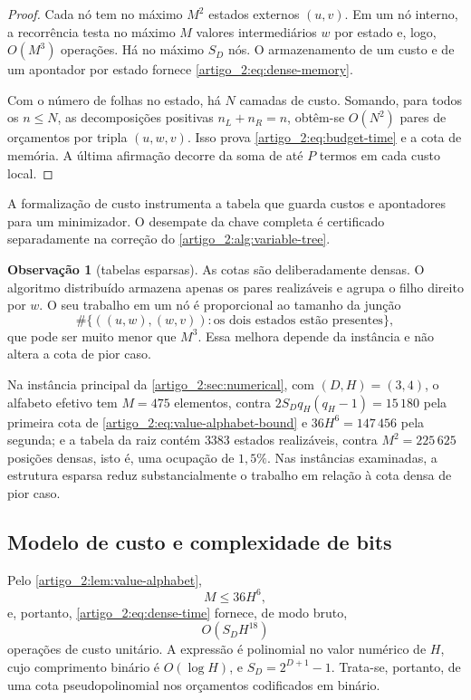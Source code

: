 \documentclass[12pt,a4paper]{article}
\theoremstyle{preciso}
\theoremstyle{definition}
\theoremstyle{preciso}
\theoremstyle{preciso}
\theoremstyle{preciso}
\theoremstyle{preciso}
\theoremstyle{definition}
\theoremstyle{preciso}
\theoremstyle{definition}
\newtheorem{remark}[teorema]{Observação}
\theoremstyle{preciso}
\theoremstyle{preciso}
\theoremstyle{definition}
\begin{document}
\begin{proof}
Cada nó tem no máximo $M^2$ estados externos $(u,v)$. Em um nó interno, a
recorrência testa no máximo $M$ valores intermediários $w$ por estado e, logo,
$O(M^3)$ operações. Há no máximo $S_D$ nós. O armazenamento de um custo e de um apontador
por estado fornece \eqref{artigo_2:eq:dense-memory}.

Com o número de folhas no estado, há $N$ camadas de custo. Somando, para todos
os $n\le N$, as decomposições positivas $n_L+n_R=n$, obtêm-se $O(N^2)$ pares de
orçamentos por tripla $(u,w,v)$. Isso prova \eqref{artigo_2:eq:budget-time} e a cota de
memória. A última afirmação decorre da soma de até $P$ termos em cada custo local.
\end{proof}

A formalização de custo instrumenta a tabela que guarda custos e
apontadores para um minimizador. O desempate da chave completa é
certificado separadamente na correção do
\cref{artigo_2:alg:variable-tree}.

\begin{remark}[tabelas esparsas]\label{map:artigo_2:9.2}
\label{artigo_2:rem:sparse}
As cotas são deliberadamente densas. O algoritmo distribuído armazena apenas
os pares realizáveis e agrupa o filho direito por $w$. O seu trabalho em um nó é
proporcional ao tamanho da junção
\[
 \#\{((u,w),(w,v)):\text{os dois estados estão presentes}\},
\]
que pode ser muito menor que $M^3$. Essa melhora depende da instância e não
altera a cota de pior caso.

Na instância principal da \cref{artigo_2:sec:numerical}, com
$(D,H)=(3,4)$, o alfabeto efetivo tem $M=475$ elementos, contra
$2S_Dq_H(q_H-1)=15\,180$ pela primeira cota de
\eqref{artigo_2:eq:value-alphabet-bound} e $36H^6=147\,456$ pela segunda; e a tabela da
raiz contém $3383$ estados realizáveis, contra $M^2=225\,625$ posições
densas, isto é, uma ocupação de $1{,}5\%$. Nas instâncias examinadas, a
estrutura esparsa reduz substancialmente o trabalho em relação à cota densa de
pior caso.
\end{remark}

\subsection{Modelo de custo e complexidade de bits}

Pelo \cref{artigo_2:lem:value-alphabet},
\[
 M\le36H^6,
\]
e, portanto, \eqref{artigo_2:eq:dense-time} fornece, de modo bruto,
\begin{equation}
 O(S_DH^{18})
 \label{artigo_2:eq:height-worst}
\end{equation}
operações de custo unitário. A expressão é polinomial no valor numérico de
$H$, cujo comprimento binário é $O(\log H)$, e
$S_D=2^{D+1}-1$. Trata-se, portanto, de uma cota pseudopolinomial nos
orçamentos codificados em binário.
\end{document}

